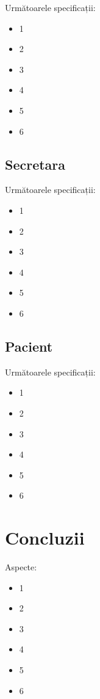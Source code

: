 \documentclass[a4paper,12pt]{article}
\begin{document}
Următoarele specificații:

\begin{itemize}
\item 1
\item 2
\item 3
\item 4
\item 5
\item 6
\end{itemize}

\subsection{Secretara}

Următoarele specificații:

\begin{itemize}
\item 1
\item 2
\item 3
\item 4
\item 5
\item 6
\end{itemize}

\subsection{Pacient}

Următoarele specificații:

\begin{itemize}
\item 1
\item 2
\item 3
\item 4
\item 5
\item 6
\end{itemize}

\section{Concluzii}

Aspecte:

\begin{itemize}
\item 1
\item 2
\item 3
\item 4
\item 5
\item 6
\end{itemize}
\end{document}
